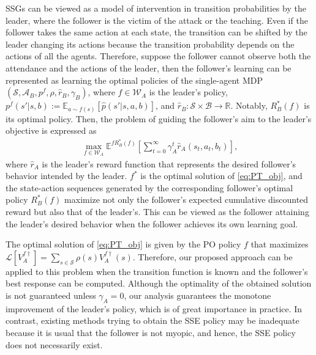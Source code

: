 \documentclass{acml}
\providecommand{\R}{\mathbb{R}} %
\providecommand{\E}{\mathbb{E}} %
\providecommand{\x}{\times}
\begin{document}
SSGs can be viewed as a model of intervention in transition probabilities by the leader, where the follower is the victim of the attack or the teaching. 
Even if the follower takes the same action at each state, the transition can be shifted by the leader changing its actions because the transition probability depends on the actions of all the agents.
Therefore, suppose the follower cannot observe both the attendance and the actions of the leader, then the follower's learning can be represented as learning the optimal policies of the single-agent MDP $(\mathcal{S},\mathcal{A}_B,p^f,\rho,\hat{r}_B,\gamma_B)$, where $f\in\mathcal{W}_A$ is the leader's policy, $p^f(s'|s,b):=\E_{a\sim f(s)}[\hat{p}(s'|s,a,b)]$, and $\hat{r}_B:\mathcal{S}\x\mathcal{B}\to\R$.
Notably, $R_B^*(f)$ is its optimal policy.
Then, the problem of guiding the follower's aim to the leader's objective is expressed as
\begin{align}
	\max_{f\in\mathcal{W}_A} \E^{fR_B^*(f)}\left[\sum_{t=0}^{\infty}\gamma_A^t\hat{r}_A(s_t,a_t,b_t)\right],\label{eq:PT_obj}
\end{align}
where $\hat{r}_A$ is the leader's reward function that represents the desired follower's behavior intended by the leader.
$f^*$ is the optimal solution of \cref{eq:PT_obj}, and the state-action sequences generated by the corresponding follower's optimal policy $R_B^*(f)$ maximize not only the follower's expected cumulative discounted reward but also that of the leader's.
This can be viewed as the follower attaining the leader's desired behavior when the follower achieves its own learning goal.


The optimal solution of \cref{eq:PT_obj} is given by the PO policy $f$ that maximizes $\mathcal{L}[V_{A}^{f\dag}] = \sum_{s \in \mathcal{S}} \rho(s) V_{A}^{f\dag}(s)$.
Therefore, our proposed approach can be applied to this problem when the transition function is known and the follower's best response can be computed. 
Although the optimality of the obtained solution is not guaranteed unless $\gamma_A = 0$, our analysis guarantees the monotone improvement of the leader's policy, which is of great importance in practice.
In contrast, existing methods trying to obtain the SSE policy may be inadequate because it is usual that the follower is not myopic, and hence, the SSE policy does not necessarily exist.
\end{document}
